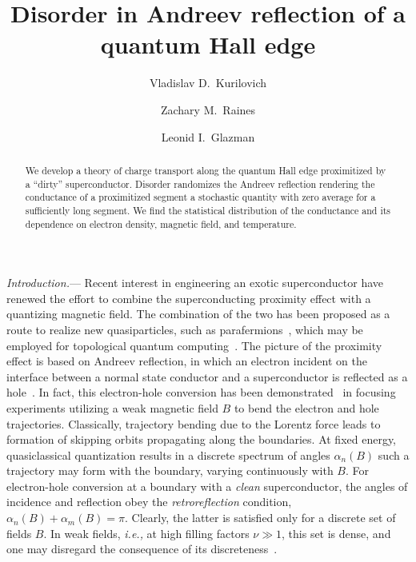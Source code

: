 \documentclass[reprint,
superscriptaddress,
amsmath,
amssymb,
aps,
prl,
floatfix,
english
]{revtex4-2}
\begin{document}
\widetext


\title{
Disorder in Andreev reflection of a quantum Hall edge
}

\author{Vladislav D.~Kurilovich}
\author{Zachary M.~Raines}
\author{Leonid I.~Glazman}


\begin{abstract}

We develop a theory of charge transport along the quantum Hall edge proximitized by a ``dirty'' superconductor. 
Disorder randomizes the Andreev reflection rendering the conductance of a proximitized segment a stochastic quantity with zero average for a sufficiently long segment. We find the statistical distribution of the conductance and its dependence on electron density, magnetic field, and temperature.
\end{abstract}


\maketitle
\textit{Introduction.}---
Recent interest in engineering an exotic superconductor have renewed the effort to combine the superconducting proximity effect with a quantizing magnetic field. The combination of the two
has been proposed as a route to realize new quasiparticles, such as parafermions~\cite{mong2014, clarke2014}, which may be employed for topological quantum computing~\cite{nayak2008}. 
The picture of the proximity effect is based on Andreev reflection, in which an electron incident on the interface between a normal state conductor and a superconductor is
reflected as a hole~\cite{andreev1964}. 
In fact, this electron-hole conversion has been demonstrated~\cite{bozhko1982,benistant1983} in focusing experiments utilizing a weak magnetic field $B$ to bend the electron and hole trajectories.  
Classically, trajectory bending due to the Lorentz force leads to formation of skipping orbits propagating along the boundaries. 
At fixed energy, quasiclassical quantization results in a discrete spectrum of 
angles $\alpha_n(B)$ such a trajectory may form with the boundary, varying continuously with $B$.  
For electron-hole conversion at a boundary with a {\it clean} superconductor, the angles of incidence and reflection obey the
{\it retroreflection} condition, $\alpha_n(B)+\alpha_m(B)=\pi$.
Clearly, the latter is satisfied only for a discrete set of fields $B$.
In weak fields, {\it i.e.,} at high filling factors $\nu\gg 1$, this set is dense,
and one may disregard the consequence of its discreteness~\cite{eroms05, batov2007}.
\end{document}
